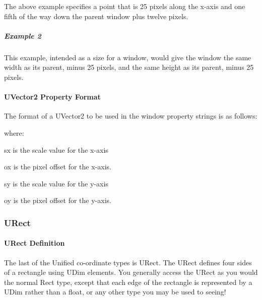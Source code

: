 \begin{DoxyCode}{0}
\end{DoxyCode}
 The above example specifies a point that is 25 pixels along the x-\/axis and one fifth of the way down the parent window plus twelve pixels.\hypertarget{fal_intro_fal_uvec2_example2}{}\subparagraph{Example 2}\label{fal_intro_fal_uvec2_example2}

\begin{DoxyCode}{0}
\end{DoxyCode}
 This example, intended as a size for a window, would give the window the same width as its parent, minus 25 pixels, and the same height as its parent, minus 25 pixels.\hypertarget{fal_intro_fal_uvector2_prop_fmt}{}\paragraph{U\+Vector2 Property Format}\label{fal_intro_fal_uvector2_prop_fmt}
The format of a U\+Vector2 to be used in the window property strings is as follows\+: 
\begin{DoxyCode}{0}
\end{DoxyCode}


where\+: \begin{DoxyItemize}
\item {\ttfamily \textquotesingle{}sx\textquotesingle{}} is the scale value for the x-\/axis \item {\ttfamily \textquotesingle{}ox\textquotesingle{}} is the pixel offset for the x-\/axis. \item {\ttfamily \textquotesingle{}sy\textquotesingle{}} is the scale value for the y-\/axis \item {\ttfamily \textquotesingle{}oy\textquotesingle{}} is the pixel offset for the y-\/axis.\end{DoxyItemize}
\hypertarget{fal_intro_fal_urect}{}\subsubsection{U\+Rect}\label{fal_intro_fal_urect}
\hypertarget{fal_intro_fal_urect_def}{}\paragraph{U\+Rect Definition}\label{fal_intro_fal_urect_def}
The last of the Unified co-\/ordinate types is U\+Rect. The U\+Rect defines four sides of a rectangle using U\+Dim elements. You generally access the U\+Rect as you would the normal \textquotesingle{}Rect\textquotesingle{} type, except that each edge of the rectangle is represented by a U\+Dim rather than a float, or any other type you may be used to seeing! 
\begin{DoxyCode}{0}
\end{DoxyCode}


